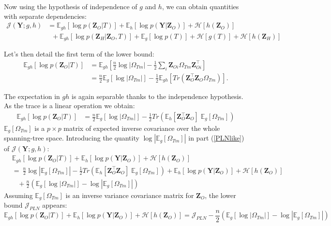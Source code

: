 \documentclass[11pt,a4paper]{article}
\newcommand{\entr}{\mathcal{H}}
\newcommand{\Ybf}{\boldsymbol{Y}}
\newcommand{\Zbf}{\boldsymbol{Z}}
\newcommand{\Esp}{\mathds{E}}
\begin{document}
Now using the hypothesis of independence of $g$ and $h$, we can obtain quantities with separate dependencies:
\begin{align}
\mathcal{J}(\Ybf; g,h)&=  \Esp_{gh}[\log p(\Zbf_O | T)] +\Esp_h[\log p(\Ybf|\Zbf_O)]+\entr[h(\Zbf_O)]  \label{PLNlike}\\
& \;\; + \Esp_{gh}[\log p(\Zbf_H | \Zbf_O,T) ]+\Esp_g[\log p(T)] +\entr[g(T)]+\entr[h(\Zbf_H)] \label{new}
\end{align}

Let's then detail the first term of the lower bound:
\begin{align*}
\Esp_{gh}[\log p(\Zbf_O|T)] &=  \Esp_{gh} \left[\frac{n}{2} \log |\Omega_{Tm}| - \frac{1}{2} \sum_i \Zbf_{Oi}\Omega_{Tm} \Zbf_{Oi}^\intercal  \right]\\
&= \frac{n}{2} \Esp_g [\log |\Omega_{Tm}|] - \frac{1}{2} \Esp_{gh}\left[Tr\left( \Zbf_O^\intercal \Zbf_O \Omega_{Tm}\right)\right].
\end{align*}

The expectation in $gh$ is again separable thanks to the independence hypothesis. As the trace is a linear operation we obtain:
\begin{align*}
\Esp_{gh}[\log p(\Zbf_O|T)] &=\frac{n}{2} \Esp_g [\log |\Omega_{Tm}|] - \frac{1}{2}  Tr\left(\Esp_h [\Zbf_O^\intercal \Zbf_O ]\; \Esp_g[\Omega_{Tm}]\right) 
\end{align*}
$\Esp_g [\Omega_{Tm}]$ is a $p\times p$ matrix of expected inverse covariance over the whole spanning-tree space. Introducing the quantity  $\log |\Esp_g [\Omega_{Tm}]| $ in part (\ref{PLNlike}) of $\mathcal{J}(\Ybf; g,h)$:
\begin{align*}
&\Esp_{gh}[\log p(\Zbf_O | T)] +\Esp_h[\log p(\Ybf|\Zbf_O)]+ \entr[h(\Zbf_O)]\\
& =\ \frac{n}{2} \log |\Esp_g [\Omega_{Tm}]| - \frac{1}{2}Tr\left(\Esp_h [\Zbf_O^\intercal \Zbf_O ]\; \Esp_g[\Omega_{Tm}]\right)+ \Esp_{h}[\log p(\Ybf|\Zbf_O)] + \entr[h(\Zbf_O)]\\
& \;\;\;+  \frac{n}{2}\left( \Esp_g[\log|\Omega_{Tm}|] - \log|\Esp_g [\Omega_{Tm}]|\right)
\end{align*}
Assuming $\Esp_g [\Omega_{Tm}]$ is an inverse variance covariance matrix for $\Zbf_O$, the lower bound $\mathcal{J}_{PLN}$ appears:
 $$\Esp_{gh}[\log p(\Zbf_O | T)] +\Esp_h[\log p(\Ybf|\Zbf_O)]+ \entr[h(\Zbf_O)] = \mathcal{J}_{PLN} - \frac{n}{2}\left( \Esp_g[\log|\Omega_{Tm}|] - \log|\Esp_g [\Omega_{Tm}]|\right)$$
 
\end{document}
